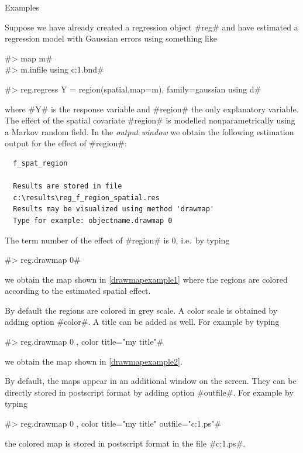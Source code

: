 \begin{stanza}{Examples}

Suppose we have already created a regression object #reg# and have
estimated a regression model with Gaussian errors using something
like

#> map m# \\
#> m.infile using c:\maps\map1.bnd#

#> reg.regress Y = region(spatial,map=m), family=gaussian using d#

where #Y# is the response variable and #region# the only
explanatory variable. The effect of the spatial covariate #region#
is modelled nonparametrically  using a Markov random field. In the
{\em output window} we obtain the following estimation output for
the effect of #region#:

\begin{verbatim}
  f_spat_region

  Results are stored in file
  c:\results\reg_f_region_spatial.res
  Results may be visualized using method 'drawmap'
  Type for example: objectname.drawmap 0
\end{verbatim}

The term number of the effect of #region# is 0, i.e.~by typing

#> reg.drawmap 0#

we obtain the map shown in \autoref{drawmapexample1} where the
regions are colored according to the estimated spatial effect.

By default the regions are colored in grey scale. A color scale is
obtained by adding option #color#. A title can be added as well.
For example by typing

#> reg.drawmap 0 , color title="my title"#

we obtain the map shown in \autoref{drawmapexample2}.

By default, the maps appear in an additional window on the screen.
They can be directly stored in postscript format by adding option
#outfile#. For example by typing

 #> reg.drawmap 0 , color title="my title" outfile="c:\results\result1.ps"#

the colored map is stored in postscript format in the file
#c:\results\result1.ps#.


\end{stanza}
